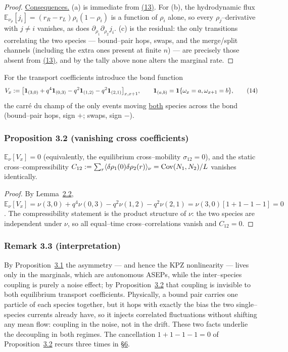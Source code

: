 \documentclass[11pt]{article}
\theoremstyle{plain}
\theoremstyle{definition}
\theoremstyle{remark}
\newcommand{\E}{\mathbb{E}}\newcommand{\PP}{\mathbb{P}}\newcommand{\dd}{\,\mathrm{d}}
\begin{document}
\begin{proof}
\underline{Consequences.} (a) is immediate from \hyperref[eq_jdecouple]{(13)}. For (b), the
hydrodynamic flux $\E_{\nu_\rho}[j_i]=(r_R-r_L)\rho_i(1-\rho_i)$ is a function of
$\rho_i$ alone, so every $\rho_j$--derivative with $j\ne i$ vanishes, as does
$\partial_{\rho_1}\partial_{\rho_2}j_i$. (c) is the residual: the only transitions
correlating the two species --- bound--pair hops, swaps, and the merge/split channels
(including the extra ones present at finite $n$) --- are precisely those absent from
\hyperref[eq_jdecouple]{(13)}, and by the tally above none alters the marginal rate.
\end{proof}

For the transport coefficients introduce the bond function
\label{eq_Vdef}
\begin{equation}
  V_x:=\big[\mathbf 1_{(3,0)}+q^4\mathbf 1_{(0,3)}-q^2\mathbf 1_{(1,2)}-q^2\mathbf 1_{(2,1)}\big]_{x,x+1},
  \qquad \mathbf 1_{(a,b)}=\mathbf 1\{\omega_x=a,\omega_{x+1}=b\},\qquad(14)
\end{equation}
the carr\'e du champ of the only events moving \underline{both} species across the bond
(bound--pair hops, sign $+$; swaps, sign $-$).

\subsubsection{Proposition 3.2 (vanishing cross coefficients)}\label{prop_cross}

$\E_\nu[V_x]=0$ \textup{(}equivalently, the equilibrium cross--mobility
$\sigma_{12}=0$\textup{)}, and the static cross--compressibility
$C_{12}:=\sum_r\langle\delta\rho_1(0)\delta\rho_2(r)\rangle_\nu=\operatorname{Cov}(N_1,N_2)/L$
vanishes identically.
\par
\begin{proof}
By Lemma~\hyperref[lem_db]{2.2},
$\E_\nu[V_x]=\nu(3,0)+q^4\nu(0,3)-q^2\nu(1,2)-q^2\nu(2,1)=\nu(3,0)[1+1-1-1]=0$. The
compressibility statement is the product structure of $\nu$: the two species are
independent under $\nu$, so all equal--time cross--correlations vanish and $C_{12}=0$.
\end{proof}

\subsubsection{Remark 3.3 (interpretation)}\label{rem_transport}

By Proposition~\hyperref[prop_decouple]{3.1} the asymmetry --- and hence the KPZ nonlinearity ---
lives only in the marginals, which are autonomous ASEPs, while the inter--species
coupling is purely a noise effect; by Proposition~\hyperref[prop_cross]{3.2} that coupling is
invisible to both equilibrium transport coefficients. Physically, a bound pair carries
one particle of each species together, but it hops with exactly the bias the two
single--species currents already have, so it injects correlated fluctuations without
shifting any mean flow: coupling in the noise, not in the drift. These two facts
underlie the decoupling in both regimes. The cancellation $1+1-1-1=0$ of
Proposition~\hyperref[prop_cross]{3.2} recurs three times in \S\hyperref[sec_ew]{6}.
\par
\end{document}
